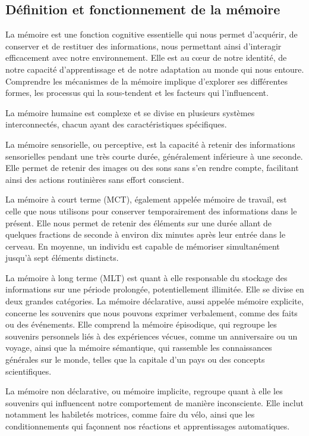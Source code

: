 \documentclass[12pt,a4paper]{report}
\begin{document}
\subsection{Définition et fonctionnement de la mémoire}

La mémoire est une fonction cognitive essentielle qui nous permet d'acquérir, de conserver et de restituer des informations, nous permettant ainsi d'interagir efficacement avec notre environnement. Elle est au cœur de notre identité, de notre capacité d'apprentissage et de notre adaptation au monde qui nous entoure. Comprendre les mécanismes de la mémoire implique d'explorer ses différentes formes, les processus qui la sous-tendent et les facteurs qui l'influencent.

La mémoire humaine est complexe et se divise en plusieurs systèmes interconnectés, chacun ayant des caractéristiques spécifiques.

La mémoire sensorielle, ou perceptive, est la capacité à retenir des informations sensorielles pendant une très courte durée, généralement inférieure à une seconde. Elle permet de retenir des images ou des sons sans s’en rendre compte, facilitant ainsi des actions routinières sans effort conscient.

La mémoire à court terme (MCT), également appelée mémoire de travail, est celle que nous utilisons pour conserver temporairement des informations dans le présent. Elle nous permet de retenir des éléments sur une durée allant de quelques fractions de seconde à environ dix minutes après leur entrée dans le cerveau. En moyenne, un individu est capable de mémoriser simultanément jusqu'à sept éléments distincts.

La mémoire à long terme (MLT) est quant à elle responsable du stockage des informations sur une période prolongée, potentiellement illimitée. Elle se divise en deux grandes catégories. La mémoire déclarative, aussi appelée mémoire explicite, concerne les souvenirs que nous pouvons exprimer verbalement, comme des faits ou des événements. Elle comprend la mémoire épisodique, qui regroupe les souvenirs personnels liés à des expériences vécues, comme un anniversaire ou un voyage, ainsi que la mémoire sémantique, qui rassemble les connaissances générales sur le monde, telles que la capitale d’un pays ou des concepts scientifiques.

La mémoire non déclarative, ou mémoire implicite, regroupe quant à elle les souvenirs qui influencent notre comportement de manière inconsciente. Elle inclut notamment les habiletés motrices, comme faire du vélo, ainsi que les conditionnements qui façonnent nos réactions et apprentissages automatiques.
\end{document}
